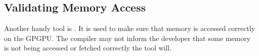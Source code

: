 \subsection{Validating Memory Access}
\label{sec:validating memory access}

Another handy tool is .
It is used to make sure that memory is accessed correctly on the GPGPU.
The compiler may not inform the developer that some memory is not being accessed or fetched correctly the tool will.~\cite{cudamemcheck2015doc}

